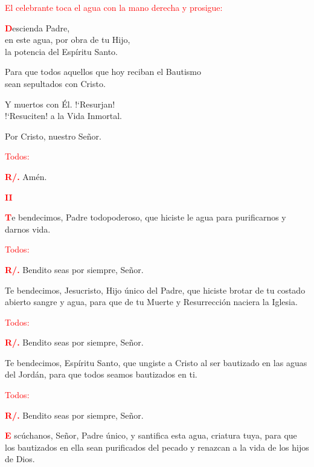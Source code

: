 \documentclass[12pt, letterpaper]{report}
\begin{document}
\large {\textcolor{red}{El celebrante toca el agua con la mano derecha y prosigue:}}

\lettrine[lines=1]{\bfseries \textcolor{red}{D}}{}\Large escienda Padre,\\ 
en este agua, por obra de tu Hijo,\\ 
la potencia del Esp\'iritu Santo.

\noindent
Para que todos aquellos que hoy reciban el Bautismo\\ 
sean sepultados con Cristo.

\noindent
Y muertos con \'El. !`Resurjan!\\ 
!`Resuciten! a la Vida Inmortal.

\noindent
Por Cristo, nuestro Se\~nor.

\large {\textcolor{red}{Todos:}}

\Large {\bfseries \textcolor{red}{R/.}} \hspace{0.5cm} Am\'en.

\newpage

\begin{center}
\Large {\bfseries \textcolor{red}{II}} 
\end{center}

\lettrine[lines=1]{\bfseries \textcolor{red}{T}}{}\Large e bendecimos, Padre todopoderoso, que hiciste le agua para purificarnos y darnos vida.

\large {\textcolor{red}{Todos:}}

\Large {\bfseries \textcolor{red}{R/.}} \hspace{0.5cm} Bendito seas por siempre, Se\~nor.

\noindent
Te bendecimos, Jesucristo, Hijo \'unico del Padre, que hiciste brotar de tu costado abierto sangre y agua, para que de tu Muerte y Resurrecci\'on naciera la Iglesia.

\large {\textcolor{red}{Todos:}}

\Large {\bfseries \textcolor{red}{R/.}} \hspace{0.5cm} Bendito seas por siempre, Se\~nor.

\noindent
Te bendecimos, Esp\'iritu Santo, que ungiste a Cristo al ser bautizado en las aguas del Jord\'an, para que todos seamos bautizados en ti.

\large {\textcolor{red}{Todos:}}

\Large {\bfseries \textcolor{red}{R/.}} \hspace{0.5cm} Bendito seas por siempre, Se\~nor.

\lettrine[lines=1]{\bfseries \textcolor{red}{E}}{} \Large sc\'uchanos, Se\~nor, Padre \'unico, y santifica esta agua, criatura tuya, para que los bautizados en ella sean purificados del pecado y renazcan a la vida de los hijos de Dios.
\end{document}
